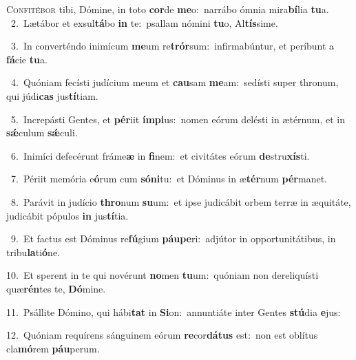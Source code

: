 \lettrine{\initial\textcolor{\initialcolor}{C}}{onfitébor} tibi, Dómine, in toto \textbf{cor}\-de \textbf{me}\-o:~\star narrábo ómnia mira\-\textbf{bí}\-lia \textbf{tu}\-a.\\
{\numbfont\textcolor{\numbcolor}{~2.}}~Lætábor et exsul\-\textbf{tá}\-bo \textbf{in} te:~\star psallam nómini \textbf{tu}\-o, Al\-\textbf{tís}\-sime.\par
{\numbfont\textcolor{\numbcolor}{~3.}}~In converténdo inimícum \textbf{me}\-um re\-\textbf{trór}\-sum:~\star infirmabúntur, et períbunt a \textbf{fá}\-cie \textbf{tu}\-a.\par
{\numbfont\textcolor{\numbcolor}{~4.}}~Quóniam fecísti judícium meum et \textbf{cau}\-sam \textbf{me}\-am:~\star sedísti super thronum, qui júdi\textbf{cas} jus\-\textbf{tí}\-tiam.\par
{\numbfont\textcolor{\numbcolor}{~5.}}~Increpásti Gentes, et \textbf{pér}\-iit \textbf{ím}\-\textbf{pi}us:~\star nomen eórum delésti in ætérnum, et in \textbf{sǽ}\-culum \textbf{sǽ}\-culi.\par
{\numbfont\textcolor{\numbcolor}{~6.}}~Inimíci defecérunt fráme\textbf{æ} in \textbf{fi}\-nem:~\star et civitátes eórum \textbf{de}\-stru\-\textbf{xís}\-ti.\par
{\numbfont\textcolor{\numbcolor}{~7.}}~Périit memória e\-\textbf{ó}\-rum cum \textbf{só}\-\textbf{ni}tu:~\star et Dóminus in æ\-\textbf{tér}\-num \textbf{pér}\-manet.\par
{\numbfont\textcolor{\numbcolor}{~8.}}~Parávit in judício \textbf{thro}\-num \textbf{su}\-um:~\star et ipse judicábit orbem terræ in æquitáte, judicábit pópulos \textbf{in} jus\-\textbf{tí}\-tia.\par
{\numbfont\textcolor{\numbcolor}{~9.}}~Et factus est Dóminus re\-\textbf{fú}\-gium \textbf{páu}\-\textbf{pe}ri:~\star adjútor in opportunitátibus, in tribu\-\textbf{la}\-ti\-\textbf{ó}\-ne.\par
{\numbfont\textcolor{\numbcolor}{10.}}~Et sperent in te qui novérunt \textbf{no}\-men \textbf{tu}\-um:~\star quóniam non dereliquísti quæ\-\textbf{rén}\-tes te, \textbf{Dó}\-mine.\par
{\numbfont\textcolor{\numbcolor}{11.}}~Psállite Dómino, qui hábi\textbf{tat} in \textbf{Si}\-on:~\star annuntiáte inter Gentes \textbf{stú}\-dia \textbf{e}\-jus:\par
{\numbfont\textcolor{\numbcolor}{12.}}~Quóniam requírens sánguinem eórum \textbf{re}\-cor\-\textbf{dá}\-\textbf{tus} est:~\star non est oblítus cla\-\textbf{mó}\-rem \textbf{páu}\-perum.\par
